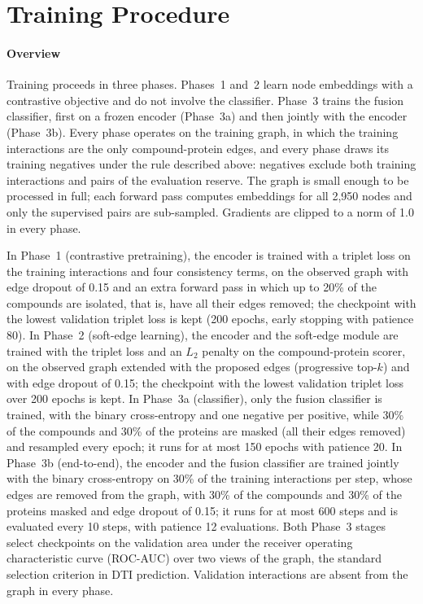 \documentclass[11pt,letterpaper]{article}
\begin{document}
\section{Training Procedure}
\label{sec:training}

\paragraph{Overview}
Training proceeds in three phases. Phases~1 and~2 learn node embeddings with a contrastive objective and do not involve the classifier. Phase~3 trains the fusion classifier, first on a frozen encoder (Phase~3a) and then jointly with the encoder (Phase~3b). Every phase operates on the training graph, in which the training interactions are the only compound-protein edges, and every phase draws its training negatives under the rule described above: negatives exclude both training interactions and pairs of the evaluation reserve. The graph is small enough to be processed in full; each forward pass computes embeddings for all 2,950 nodes and only the supervised pairs are sub-sampled. Gradients are clipped to a norm of 1.0 in every phase.

In Phase~1 (contrastive pretraining), the encoder is trained with a triplet loss on the training interactions and four consistency terms, on the observed graph with edge dropout of 0.15 and an extra forward pass in which up to 20\% of the compounds are isolated, that is, have all their edges removed; the checkpoint with the lowest validation triplet loss is kept (200 epochs, early stopping with patience 80). In Phase~2 (soft-edge learning), the encoder and the soft-edge module are trained with the triplet loss and an $L_2$ penalty on the compound-protein scorer, on the observed graph extended with the proposed edges (progressive top-$k$) and with edge dropout of 0.15; the checkpoint with the lowest validation triplet loss over 200 epochs is kept. In Phase~3a (classifier), only the fusion classifier is trained, with the binary cross-entropy and one negative per positive, while 30\% of the compounds and 30\% of the proteins are masked (all their edges removed) and resampled every epoch; it runs for at most 150 epochs with patience 20. In Phase~3b (end-to-end), the encoder and the fusion classifier are trained jointly with the binary cross-entropy on 30\% of the training interactions per step, whose edges are removed from the graph, with 30\% of the compounds and 30\% of the proteins masked and edge dropout of 0.15; it runs for at most 600 steps and is evaluated every 10 steps, with patience 12 evaluations. Both Phase~3 stages select checkpoints on the validation area under the receiver operating characteristic curve (ROC-AUC) over two views of the graph, the standard selection criterion in DTI prediction. Validation interactions are absent from the graph in every phase.
\end{document}
